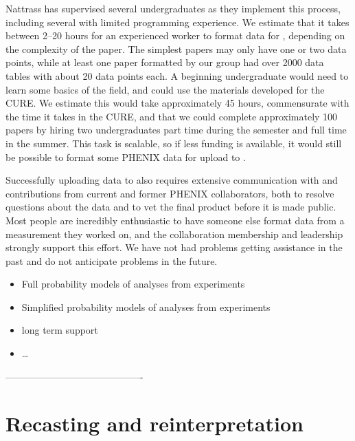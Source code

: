 \documentclass[11pt]{article}
\begin{document}
{Nattrass has supervised several undergraduates as they implement this process, including several with limited programming experience.  We estimate that it takes between 2--20 hours for an experienced worker to format data for \hepdata, depending on the complexity of the paper.  The simplest papers may only have one or two data points, while at least one paper formatted by our group had over 2000 data tables with about 20 data points each.  A beginning undergraduate would need to learn some basics of the field, and could use the materials developed for the CURE.  We estimate this would take approximately 45 hours, commensurate with the time it takes in the CURE, and that we could complete approximately 100 papers by hiring two undergraduates part time during the semester and full time in the summer.  This task is scalable, so if less funding is available, it would still be possible to format some PHENIX data for upload to \hepdata.
\hrulex

Successfully uploading data to \hepdata also requires extensive communication with and contributions from current and former PHENIX collaborators, both to resolve questions about the data and to vet the final product before it is made public.  Most people are incredibly enthusiastic to have someone else format data from a measurement they worked on, and the collaboration membership and leadership strongly support this effort.  We have not had problems getting assistance in the past and do not anticipate problems in the future.
}


\begin{itemize}
    \item Full probability models of analyses from experiments
    \item Simplified probability models of analyses from experiments
    \item \hepdata long term support
    \item \ldots
\end{itemize}


-------------------------------------------

\section{Recasting and reinterpretation}
\end{document}
